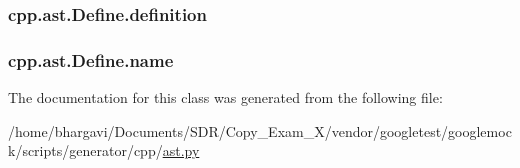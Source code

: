 \subsubsection[{\texorpdfstring{definition}{definition}}]{\setlength{\rightskip}{0pt plus 5cm}cpp.\+ast.\+Define.\+definition}\hypertarget{classcpp_1_1ast_1_1_define_a0c636652dfeb2f15e62793afea1153c9}{}\label{classcpp_1_1ast_1_1_define_a0c636652dfeb2f15e62793afea1153c9}
\subsubsection[{\texorpdfstring{name}{name}}]{\setlength{\rightskip}{0pt plus 5cm}cpp.\+ast.\+Define.\+name}\hypertarget{classcpp_1_1ast_1_1_define_a8879216f09e88f79d7baa49bcfa10ebd}{}\label{classcpp_1_1ast_1_1_define_a8879216f09e88f79d7baa49bcfa10ebd}


The documentation for this class was generated from the following file\+:\begin{DoxyCompactItemize}
\item 
/home/bhargavi/\+Documents/\+S\+D\+R/\+Copy\+\_\+\+Exam\+\_\+X/vendor/googletest/googlemock/scripts/generator/cpp/\hyperlink{ast_8py}{ast.\+py}\end{DoxyCompactItemize}
